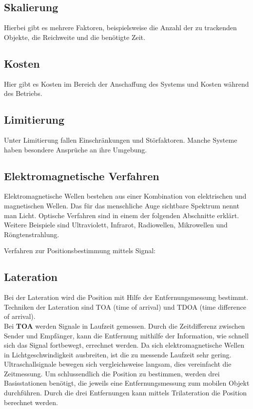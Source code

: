     \subsection*{Skalierung}
    Hierbei gibt es mehrere Faktoren, beispielsweise die Anzahl der zu trackenden Objekte, die Reichweite und die benötigte Zeit.

    \subsection*{Kosten}
    Hier gibt es Kosten im Bereich der Anschaffung des Systems und Kosten während des Betriebs.

    \subsection*{Limitierung}
    Unter Limitierung fallen Einschränkungen und Störfaktoren. Manche Systeme haben besondere Ansprüche an ihre Umgebung.

    \subsection{Elektromagnetische Verfahren}
    Elektromagnetische Wellen bestehen aus einer Kombination von elektrischen und magnetischen Wellen. Das für das menschliche Auge sichtbare Spektrum nennt man Licht. Optische Verfahren sind in einem der folgenden Abschnitte erklärt. Weitere Beispiele sind Ultraviolett, Infrarot, Radiowellen, Mikrowellen und Röngtenstrahlung.

    Verfahren zur Positionsbestimmung mittels Signal: \cite{pos_signal_2} \cite{pos_signal_4}

    \subsection*{Lateration}
    Bei der Lateration wird die Position mit Hilfe der Entfernungsmessung bestimmt.
    Techniken der Lateration sind TOA (time of arrival) und TDOA (time difference of arrival).\\
    Bei \textbf{TOA} werden Signale in Laufzeit gemessen. Durch die Zeitdifferenz zwischen Sender und Empfänger, kann die Entfernung mithilfe der Information, wie schnell sich das Signal fortbewegt, errechnet werden. Da sich elektromagnetische Wellen in Lichtgeschwindigkeit ausbreiten, ist die zu messende Laufzeit sehr gering. Ultraschallsignale bewegen sich vergleichsweise langsam, dies vereinfacht die Zeitmessung.
    Um schlussendlich die Position zu bestimmen, werden drei Basisstationen benötigt, die jeweils eine Entfernungsmessung zum mobilen Objekt durchführen. Durch die drei Entfernungen kann mittels Trilateration die Position berechnet werden.

